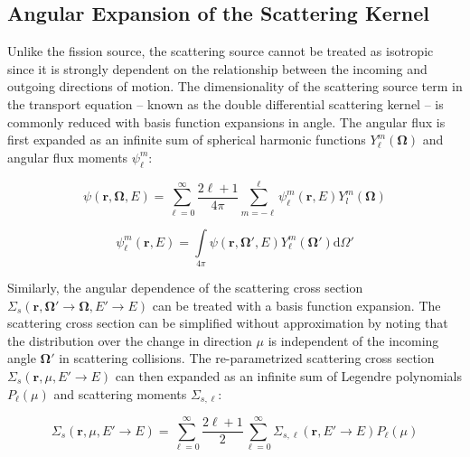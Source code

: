 \subsection{Angular Expansion of the Scattering Kernel}
\label{subsec:chap2-scatt-src}

Unlike the fission source, the scattering source cannot be treated as isotropic since it is strongly dependent on the relationship between the incoming and outgoing directions of motion. The dimensionality of the scattering source term in the transport equation -- known as the double differential scattering kernel -- is commonly reduced with basis function expansions in angle. The angular flux is first expanded as an infinite sum of spherical harmonic functions $Y_{\ell}^{m}(\mathbf{\Omega})$ and angular flux moments $\psi_{\ell}^{m}$:

\begin{dmath}
\label{eqn:chap2-flux-expand}
\psi(\mathbf{r},\mathbf{\Omega},E) = \displaystyle\sum\limits_{\ell=0}^{\infty} \frac{2\ell+1}{4\pi} \displaystyle\sum\limits_{m=-\ell}^{\ell} \psi_{\ell}^{m}(\mathbf{r},E)Y_{l}^{m}(\mathbf{\Omega})
\end{dmath}

\begin{dmath}
\label{eqn:chap2-flux-moment}
\psi_{\ell}^{m}(\mathbf{r},E) = \displaystyle\int\limits_{4\pi} \psi(\mathbf{r},\mathbf{\Omega'},E)Y_{\ell}^{m}(\mathbf{\Omega'}) \mathrm{d}\Omega'
\end{dmath}

Similarly, the angular dependence of the scattering cross section $\Sigma_{s}(\mathbf{r},{\mathbf{\Omega'}\rightarrow\mathbf{\Omega}},{E'\rightarrow E})$ can be treated with a basis function expansion. The scattering cross section can be simplified without approximation by noting that the distribution over the change in direction $\mu$ is independent of the incoming angle $\mathbf{\Omega'}$ in scattering collisions. The re-parametrized scattering cross section $\Sigma_{s}(\mathbf{r},\mu,E'\rightarrow E)$ can then expanded as an infinite sum of Legendre polynomials $P_{\ell}(\mu)$ and scattering moments $\Sigma_{s,\ell}$:

\begin{dmath}
\label{eqn:chap2-scatt-expand}
\Sigma_{s}(\mathbf{r},\mu,E'\rightarrow E) = \displaystyle\sum\limits_{\ell=0}^{\infty} \frac{2\ell+1}{2} \displaystyle\sum\limits_{\ell=0}^{\infty}\Sigma_{s,\ell}(\mathbf{r},{E'\rightarrow E})P_{\ell}(\mu)
\end{dmath}

